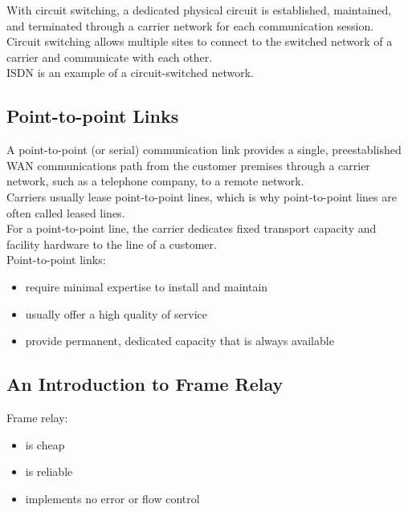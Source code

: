 With circuit switching, a dedicated physical circuit is established, maintained,
and terminated through a carrier network for each communication session.\\

Circuit switching allows multiple sites to connect to the switched network of a
carrier and communicate with each other.\\

ISDN is an example of a circuit-switched network.

\subsection{Point-to-point Links}

A point-to-point (or serial) communication link provides a single,
preestablished WAN communications path from the customer premises through a
carrier network, such as a telephone company, to a remote network.\\

Carriers usually lease point-to-point lines, which is why point-to-point lines
are often called leased lines.\\

For a point-to-point line, the carrier dedicates fixed transport capacity and
facility hardware to the line of a customer.\\

Point-to-point links:

\begin{itemize}

\item require minimal expertise to install and maintain

\item usually offer a high quality of service

\item provide permanent, dedicated capacity that is always available

\end{itemize}

\subsection{An Introduction to Frame Relay}

Frame relay:

\begin{itemize}
\item is cheap
\item is reliable
\item implements no error or flow control
\end{itemize}

